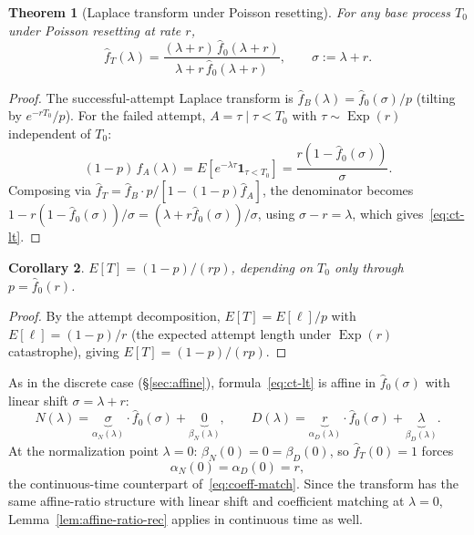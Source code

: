 \documentclass[11pt]{article}
\theoremstyle{plain}
\newtheorem{theorem}{Theorem}[section]
\newtheorem{corollary}[theorem]{Corollary}
\theoremstyle{definition}
\theoremstyle{remark}
\DeclareMathOperator{\Exp}{Exp}
\begin{document}
\begin{theorem}[Laplace transform under Poisson resetting]\label{thm:ct-pgf}
For any base process $T_0$ under Poisson resetting at rate $r$,
\begin{equation}\label{eq:ct-lt}
  \hat{f}_T(\lambda) = \frac{(\lambda + r)\,\hat{f}_0(\lambda + r)}{\lambda + r\,\hat{f}_0(\lambda + r)}, \qquad \sigma := \lambda + r.
\end{equation}
\end{theorem}

\begin{proof}
The successful-attempt Laplace transform is $\hat{f}_B(\lambda) = \hat{f}_0(\sigma)/p$ (tilting by $e^{-rT_0}/p$).  For the failed attempt, $A = \tau \mid \tau < T_0$ with $\tau \sim \Exp(r)$ independent of $T_0$:
\[
  (1-p)\,\hat{f}_A(\lambda) = E[e^{-\lambda\tau}\mathbf{1}_{\tau < T_0}] = \frac{r(1 - \hat{f}_0(\sigma))}{\sigma}.
\]
Composing via $\hat{f}_T = \hat{f}_B \cdot p/[1-(1-p)\hat{f}_A]$, the denominator becomes $1 - r(1-\hat{f}_0(\sigma))/\sigma = (\lambda + r\hat{f}_0(\sigma))/\sigma$, using $\sigma - r = \lambda$, which gives~\eqref{eq:ct-lt}.

\end{proof}

\begin{corollary}\label{cor:ct-ET}
$E[T] = (1-p)/(rp)$, depending on $T_0$ only through $p = \hat{f}_0(r)$.
\end{corollary}

\begin{proof}
By the attempt decomposition, $E[T] = E[\ell]/p$ with $E[\ell] = (1-p)/r$ (the expected attempt length under $\Exp(r)$ catastrophe), giving $E[T] = (1-p)/(rp)$.
\end{proof}



As in the discrete case (\S\ref{sec:affine}), formula~\eqref{eq:ct-lt} is affine in $\hat{f}_0(\sigma)$ with linear shift $\sigma = \lambda + r$:
\begin{equation}\label{eq:ct-affine}
  N(\lambda) = \underbrace{\sigma}_{\alpha_N(\lambda)} \cdot \hat{f}_0(\sigma) + \underbrace{0}_{\beta_N(\lambda)}, \qquad
  D(\lambda) = \underbrace{r}_{\alpha_D(\lambda)} \cdot \hat{f}_0(\sigma) + \underbrace{\lambda}_{\beta_D(\lambda)}.
\end{equation}
At the normalization point $\lambda = 0$: $\beta_N(0) = 0 = \beta_D(0)$, so $\hat{f}_T(0) = 1$ forces
\begin{equation}\label{eq:ct-coeff-match}
  \alpha_N(0) = \alpha_D(0) = r,
\end{equation}
the continuous-time counterpart of~\eqref{eq:coeff-match}.  Since the transform has the same affine-ratio structure with linear shift and coefficient matching at $\lambda=0$, Lemma~\ref{lem:affine-ratio-rec} applies in continuous time as well.
\end{document}

